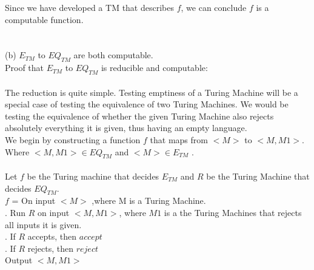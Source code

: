 \documentclass{report}
\begin{document}
Since we have developed a TM that describes $f$, we can conclude $f$ is a computable function.
\\ \\ \\
\indent (b) $ E_{TM}$ to $EQ_{TM} $ are both computable.\\
Proof that $ E_{TM}$ to $EQ_{TM} $ is reducible and computable: \\ \\
The reduction is quite simple. Testing emptiness of a Turing Machine will be a special case of testing the equivalence of two Turing Machines. We would be testing the equivalence of whether the given Turing Machine also rejects absolutely everything it is given, thus having an empty language.  \\
We begin by constructing a function $f$ that maps from  $<M>$ to  $<M,M1>$. Where $<M,M1>\in EQ_{TM}$ and $<M> \in E_{TM}$ .\\ \\ Let $f$ be the Turing machine that decides $E_{TM}$ and $R$ be the Turing Machine that decides $EQ_{TM}$. \\

$f$ = On input $<M> $ ,where M is a Turing Machine.\\ 
. Run $R$ on input $<M,M1>$, where $M1$ is a the Turing Machines that rejects all inputs it is given. \\
. If $R$ accepts, then $accept$ \\
. If $R$ rejects, then $reject$ \\
Output $<M,M1>$






\end{document}
